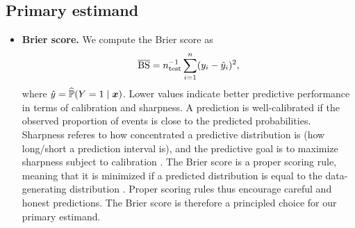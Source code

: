 \documentclass[a4paper, 11pt]{article}\usepackage[]{graphicx}\usepackage[]{color}
\begin{document}
\subsection{Primary estimand}

\begin{itemize}
  \item \textbf{Brier score.} We compute the Brier score as
  $$\operatorname{\overline{BS}} = n_{\text{test}}^{-1} \sum_{i=1}^n (y_{i} - \hat{y}_{i})^2,$$
  where $\hat{y} = \widehat{\mathbb{P}}(Y = 1 \mid \text{\boldmath$x$})$.
  Lower values indicate better predictive performance in terms of calibration and
  sharpness. A prediction is well-calibrated if the observed proportion
  of events is close to the predicted probabilities. Sharpness referes to how
  concentrated a predictive distribution is (\eg how long/short a prediction interval is),
  and the predictive goal is to maximize sharpness subject to calibration
  \citep{Gneiting2008}.
  The Brier score is a proper scoring rule, meaning that it is minimized if a
  predicted distribution is equal to the data-generating distribution
  \citep{Gneiting2007}. Proper scoring rules thus encourage careful and honest
  predictions. The Brier score is therefore a principled choice for our primary estimand.
\end{itemize}
\end{document}
